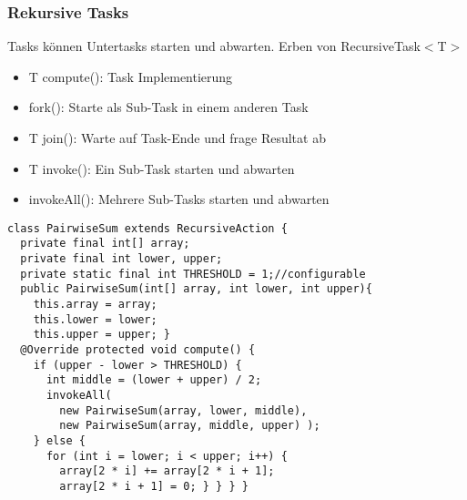\subsubsection{Rekursive Tasks}
Tasks können Untertasks starten und abwarten. Erben von RecursiveTask$<$T$>$
\begin{itemize}[topsep=0pt, leftmargin=3mm]
    \setlength\itemsep{-0.3em}
    \item T compute(): Task Implementierung
    \item fork(): Starte als Sub-Task in einem anderen Task
    \item T join(): Warte auf Task-Ende und frage Resultat ab
    \item T invoke(): Ein Sub-Task starten und abwarten
    \item invokeAll(): Mehrere Sub-Tasks starten und abwarten
\end{itemize}
\begin{lstlisting}
class PairwiseSum extends RecursiveAction {
  private final int[] array;
  private final int lower, upper;
  private static final int THRESHOLD = 1;//configurable
  public PairwiseSum(int[] array, int lower, int upper){
    this.array = array;
    this.lower = lower;
    this.upper = upper; }
  @Override protected void compute() {
    if (upper - lower > THRESHOLD) {
      int middle = (lower + upper) / 2;
      invokeAll(
        new PairwiseSum(array, lower, middle),
        new PairwiseSum(array, middle, upper) );
    } else {
      for (int i = lower; i < upper; i++) {
        array[2 * i] += array[2 * i + 1];
        array[2 * i + 1] = 0; } } } }
\end{lstlisting}

